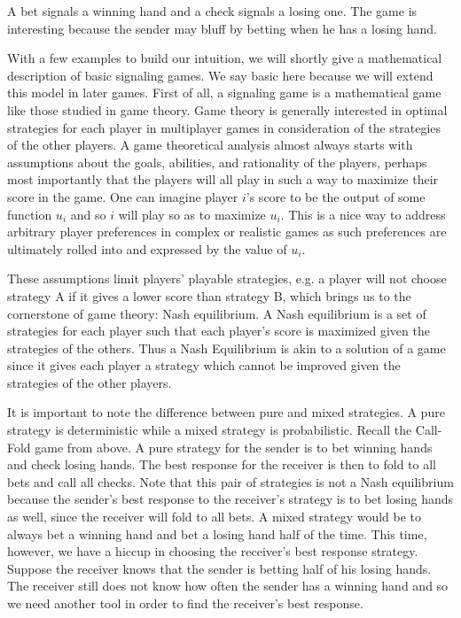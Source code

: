 \documentclass{article}
\begin{document}
A bet signals a winning hand and a check signals a losing one. The game is interesting because the sender may bluff by betting when he has a losing hand. 

With a few examples to build our intuition, we will shortly give a mathematical description of basic signaling games. We say basic here because we will extend this model in later games. First of all, a signaling game is a mathematical game like those studied in game theory. Game theory is generally interested in optimal strategies for each player in multiplayer games in consideration of the strategies of the other players. A game theoretical analysis almost always starts with assumptions about the goals, abilities, and rationality of the players, perhaps most importantly that the players will all play in such a way to maximize their score in the game. One can imagine player $i$'s score to be the output of some function $u_i$ and so $i$ will play so as to maximize $u_i$. This is a nice way to address arbitrary player preferences in complex or realistic games as such preferences are ultimately rolled into and expressed by the value of $u_i$. 

These assumptions limit players' playable strategies, e.g. a player will not choose strategy A if it gives a lower score than strategy B, which brings us to the cornerstone of game theory: Nash equilibrium. A Nash equilibrium is a set of strategies for each player such that each player's score is maximized given the strategies of the others. Thus a Nash Equilibrium is akin to a solution of a game since it gives each player a strategy which cannot be improved given the strategies of the other players.

It is important to note the difference between pure and mixed strategies. A pure strategy is deterministic while a mixed strategy is probabilistic. Recall the Call-Fold game from above. A pure strategy for the sender is to bet winning hands and check losing hands. The best response for the receiver is then to fold to all bets and call all checks. Note that this pair of strategies is not a Nash equilibrium because the sender's best response to the receiver's strategy is to bet losing hands as well, since the receiver will fold to all bets. A mixed strategy would be to always bet a winning hand and bet a losing hand half of the time. This time, however, we have a hiccup in choosing the receiver's best response strategy. Suppose the receiver knows that the sender is betting half of his losing hands. The receiver still does not know how often the sender has a winning hand and so we need another tool in order to find the receiver's best response.
\end{document}
